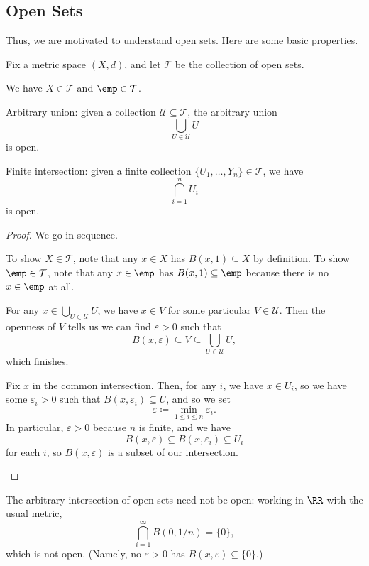 \documentclass[../notes.tex]{subfiles}
\begin{document}
\subsection{Open Sets}
Thus, we are motivated to understand open sets. Here are some basic properties.
\begin{proposition} \label{prop:topodef}
	Fix a metric space $(X,d)$, and let $\mathcal T$ be the collection of open sets.
	\begin{listalph}
		\item We have $X\in\mathcal T$ and $\emp\in\mathcal T$.
		\item Arbitrary union: given a collection $\mathcal U\subseteq\mathcal T$, the arbitrary union
		\[\bigcup_{U\in\mathcal U}U\]
		is open.
		\item Finite intersection: given a finite collection $\{U_1,\ldots,Y_n\}\in\mathcal T$, we have
		\[\bigcap_{i=1}^nU_i\]
		is open.
	\end{listalph}
\end{proposition}
\begin{proof}
	We go in sequence.
	\begin{listalph}
		\item To show $X\in\mathcal T$, note that any $x\in X$ has $B(x,1)\subseteq X$ by definition. To show $\emp\in\mathcal T$, note that any $x\in\emp$ has $B(x,1)\subseteq\emp$ because there is no $x\in\emp$ at all.
		\item For any $x\in\bigcup_{U\in\mathcal U}U$, we have $x\in V$ for some particular $V\in\mathcal U$. Then the openness of $V$ tells us we can find $\varepsilon>0$ such that
		\[B(x,\varepsilon)\subseteq V\subseteq\bigcup_{U\in\mathcal U}U,\]
		which finishes.
		\item Fix $x$ in the common intersection. Then, for any $i$, we have $x\in U_i$, so we have some $\varepsilon_i>0$ such that $B(x,\varepsilon_i)\subseteq U$, and so we set
		\[\varepsilon\coloneqq\min_{1\le i\le n}\varepsilon_i.\]
		In particular, $\varepsilon>0$ because $n$ is finite, and we have
		\[B(x,\varepsilon)\subseteq B(x,\varepsilon_i)\subseteq U_i\]
		for each $i$, so $B(x,\varepsilon)$ is a subset of our intersection.
		\qedhere
	\end{listalph}
\end{proof}
\begin{remark}
	The arbitrary intersection of open sets need not be open: working in $\RR$ with the usual metric,
	\[\bigcap_{i=1}^\infty B(0,1/n)=\{0\},\]
	which is not open. (Namely, no $\varepsilon>0$ has $B(x,\varepsilon)\subseteq\{0\}$.)
\end{remark}
\end{document}
